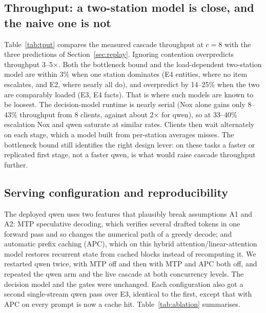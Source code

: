 \documentclass[11pt]{article}
\begin{document}
\subsection{Throughput: a two-station model is close, and the naive one is not}
Table~\ref{tab:tput} compares the measured cascade throughput at $c=8$ with the three predictions of
Section~\ref{sec:replay}. Ignoring contention overpredicts throughput 3--5$\times$. Both the bottleneck
bound and the load-dependent two-station model are within 3\% when one station dominates (E4 entities,
where no item escalates, and E2, where nearly all do), and overpredict by 14--25\% when the two are
comparably loaded (E3, E4 facts). That is where such models are known to be loosest. The decision-model
runtime is nearly serial (Nox alone gains only 8--43\% throughput from 8 clients, against about
2$\times$ for qwen), so at 33--40\% escalation Nox and qwen saturate at similar rates. Clients
then wait alternately on each stage, which a model built from per-station averages misses. The
bottleneck bound still identifies the right design lever: on these tasks a faster or replicated
first stage, not a faster qwen, is what would raise cascade throughput further.

\begin{table}[t]
\centering
\small

\caption{Cascade throughput at 8 concurrent clients: three analytical predictions against the
measurement. ``No contention'' is $c/\mathbb{E}[\hat T]$ with single-stream service times; ``bound'' is
$\min(X_S^{\max}, X_B^{\max}/p)$ from the standalone 8-client runs; ``model'' is the load-dependent
two-station closed network of Section~\ref{sec:replay}. Errors are relative to the measurement.}
\label{tab:tput}
\end{table}

\subsection{Serving configuration and reproducibility}
\label{sec:ablation}
The deployed qwen uses two features that plausibly break assumptions A1 and A2: MTP speculative
decoding, which verifies several drafted tokens in one forward pass and so changes the numerical
path of a greedy decode; and automatic prefix caching (APC), which on this hybrid
attention/linear-attention model restores recurrent state from cached blocks instead of recomputing
it. We restarted qwen twice, with MTP off and then with MTP and APC both off, and repeated the qwen
arm and the live cascade at both concurrency levels. The decision model and the gates were unchanged.
Each configuration also got a second single-stream qwen pass over E3, identical to the first,
except that with APC on every prompt is now a cache hit. Table~\ref{tab:ablation} summarises.
\end{document}
